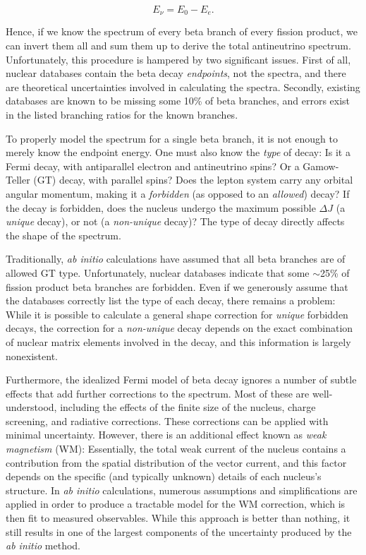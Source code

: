 \documentclass[../thesis.tex]{subfiles}
\begin{document}
\[ E_\nu = E_0 - E_e. \]

Hence, if we know the spectrum of every beta branch of every fission product, we can invert them all and sum them up to derive the total antineutrino spectrum. Unfortunately, this procedure is hampered by two significant issues. First of all, nuclear databases contain the beta decay \emph{endpoints}, not the spectra, and there are theoretical uncertainties involved in calculating the spectra. Secondly, existing databases are known to be missing some 10\% of beta branches, and errors exist in the listed branching ratios for the known branches.

To properly model the spectrum for a single beta branch, it is not enough to merely know the endpoint energy. One must also know the \emph{type} of decay: Is it a Fermi decay, with antiparallel electron and antineutrino spins? Or a Gamow-Teller (GT) decay, with parallel spins? Does the lepton system carry any orbital angular momentum, making it a \emph{forbidden} (as opposed to an \emph{allowed}) decay? If the decay is forbidden, does the nucleus undergo the maximum possible $\Delta J$ (a \emph{unique} decay), or not (a \emph{non-unique} decay)? The type of decay directly affects the shape of the spectrum.

Traditionally, \emph{ab initio} calculations have assumed that all beta branches are of allowed GT type. Unfortunately, nuclear databases indicate that some $\sim$25\% of fission product beta branches are forbidden. Even if we generously assume that the databases correctly list the type of each decay, there remains a problem: While it is possible to calculate a general shape correction for \emph{unique} forbidden decays, the correction for a \emph{non-unique} decay depends on the exact combination of nuclear matrix elements involved in the decay, and this information is largely nonexistent.

Furthermore, the idealized Fermi model of beta decay ignores a number of subtle effects that add further corrections to the spectrum. Most of these are well-understood, including the effects of the finite size of the nucleus, charge screening, and radiative corrections. These corrections can be applied with minimal uncertainty. However, there is an additional effect known as \emph{weak magnetism} (WM): Essentially, the total weak current of the nucleus contains a contribution from the spatial distribution of the vector current, and this factor depends on the specific (and typically unknown) details of each nucleus's structure. In \emph{ab initio} calculations, numerous assumptions and simplifications are applied in order to produce a tractable model for the WM correction, which is then fit to measured observables. While this approach is better than nothing, it still results in one of the largest components of the uncertainty produced by the \emph{ab initio} method.
\end{document}
